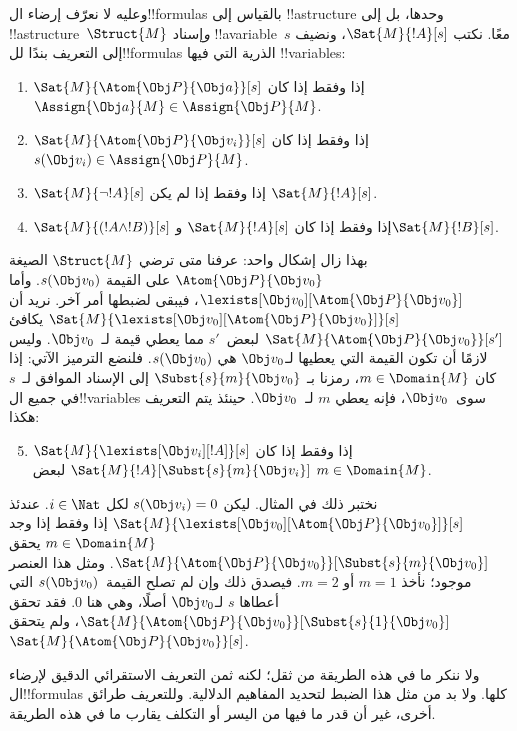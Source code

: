 \documentclass[../../../include/open-logic-section]{subfiles}
\begin{document}
وعليه لا نعرّف إرضاء ال!!{formula}s بالقياس إلى !!a{structure}
وحدها، بل إلى !!a{structure}~$\Struct{M}$ \emph{و}إسناد
!!a{variable}~$s$ معًا. نكتب $\Sat{M}{!A}[s]$، ونضيف إلى
التعريف بندًا لل!!{formula}s الذرية التي فيها !!{variable}s:

\begin{enumerate}
  \item $\Sat{M}{\Atom{\Obj P}{\Obj a}}[s]$ إذا وفقط إذا كان
  $\Assign{\Obj a}{M} \in \Assign{\Obj P}{M}$.
  \item $\Sat{M}{\Atom{\Obj P}{\Obj v_i}}[s]$ إذا وفقط إذا كان
  $s(\Obj v_i) \in \Assign{\Obj P}{M}$.
  \item $\Sat{M}{\lnot !A}[s]$ إذا وفقط إذا لم يكن
  $\Sat{M}{!A}[s]$.
  \item $\Sat{M}{(!A \land !B)}[s]$ إذا وفقط إذا كان
  $\Sat{M}{!A}[s]$ و$\Sat{M}{!B}[s]$.
\end{enumerate}
بهذا زال إشكال واحد: عرفنا متى ترضي $\Struct{M}$
الصيغة $\Atom{\Obj P}{\Obj v_0}$ على القيمة $s(\Obj v_0)$.
وأما $\lexists[\Obj v_0][\Atom{\Obj P}{\Obj v_0}]$، فيبقى
لضبطها أمر آخر. نريد أن
$\Sat{M}{\lexists[\Obj v_0][\Atom{\Obj P}{\Obj v_0}]}[s]$
يكافئ $\Sat{M}{\Atom{\Obj P}{\Obj v_0}}[s']$ لبعض~$s'$
مما يعطي قيمة لـ~$\Obj v_0$. وليس لازمًا أن تكون القيمة التي
يعطيها لـ$\Obj v_0$ هي $s(\Obj v_0)$. فلنضع الترميز الآتي:
إذا كان $m \in \Domain{M}$، رمزنا بـ
$\Subst{s}{m}{\Obj v_0}$ إلى الإسناد الموافق لـ~$s$ في جميع
ال!!{variable}s سوى~$\Obj v_0$، فإنه يعطي $m$ لـ~$\Obj v_0$.
حينئذ يتم التعريف هكذا:

\begin{enumerate}\setcounter{enumi}{4}
  \item $\Sat{M}{\lexists[\Obj v_i][!A]}[s]$ إذا وفقط إذا كان
  $\Sat{M}{!A}[\Subst{s}{m}{\Obj v_i}]$ لبعض
  $m \in \Domain{M}$.
\end{enumerate}
نختبر ذلك في المثال. ليكن $s(\Obj v_i) = 0$ لكل
$i \in \Nat$. عندئذ
$\Sat{M}{\lexists[\Obj v_0][\Atom{\Obj P}{\Obj v_0}]}[s]$
إذا وفقط إذا وجد $m \in \Domain{M}$ يحقق
$\Sat{M}{\Atom{\Obj P}{\Obj v_0}}[\Subst{s}{m}{\Obj v_0}]$.
ومثل هذا العنصر موجود؛ نأخذ $m = 1$ أو $m = 2$.
فيصدق ذلك وإن لم تصلح القيمة~$s(\Obj v_0)$ التي أعطاها $s$
لـ$\Obj v_0$ أصلًا، وهي هنا $0$. فقد تحقق
$\Sat{M}{\Atom{\Obj P}{\Obj v_0}}[\Subst{s}{1}{\Obj v_0}]$،
ولم يتحقق $\Sat{M}{\Atom{\Obj P}{\Obj v_0}}[s]$.

ولا ننكر ما في هذه الطريقة من ثقل؛ لكنه ثمن التعريف الاستقرائي
الدقيق لإرضاء ال!!{formula}s كلها. ولا بد من مثل هذا الضبط
لتحديد المفاهيم الدلالية. وللتعريف طرائق أخرى، غير أن قدر ما فيها
من اليسر أو التكلف يقارب ما في هذه الطريقة.
\end{document}
